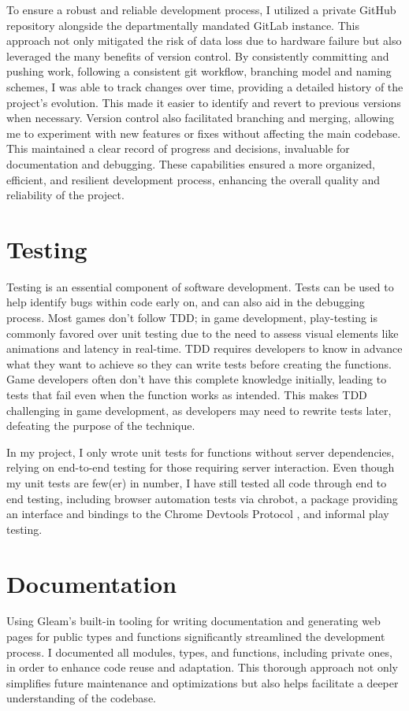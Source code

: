 \documentclass[]{final}
\begin{document}
To ensure a robust and reliable development process, I utilized a private GitHub repository
alongside the departmentally mandated GitLab instance. This approach not only mitigated
the risk of data loss due to hardware failure but also leveraged the many benefits of
version control. By consistently committing and pushing work, following a consistent
git workflow, branching model and naming schemes, I was able to track changes
over time, providing a detailed history of the project's evolution. This made
it easier to identify and revert to previous versions when necessary. Version
control also facilitated branching and merging, allowing me to experiment with
new features or fixes without affecting the main codebase. This maintained a
clear record of progress and decisions, invaluable for documentation and debugging.
These capabilities ensured a more organized, efficient, and resilient development
process, enhancing the overall quality and reliability of the project.

\section{Testing}
Testing is an essential component of software development. Tests can be used to
help identify bugs within code early on, and can also aid in the debugging process.
Most games don't follow TDD; in game development, play-testing is commonly favored
over unit testing due to the need to assess visual elements like animations and
latency in real-time.\cite{politowski_survey_2021} TDD requires developers to know
in advance what they want to
achieve so they can write tests before creating the functions. Game developers often don't
have this complete knowledge initially, leading to tests that fail even when the function
works as intended. This makes TDD challenging in game development, as developers may
need to rewrite tests later, defeating the purpose of the technique.

In my project, I only wrote unit tests for functions without server
dependencies, relying on end-to-end testing for those requiring server interaction.
Even though my unit tests are few(er) in number, I have still tested all code through
end to end testing, including browser automation tests via chrobot, a package providing
an interface and bindings to the Chrome Devtools Protocol \cite{noauthor_chrobot_nodate},
and informal play testing.

\section{Documentation}
Using Gleam's built-in tooling for writing documentation and generating web pages
for public types and functions significantly streamlined the development process.
I documented all modules, types, and functions, including private ones,
in order to enhance code reuse and adaptation. This thorough approach not
only simplifies future maintenance and optimizations but also helps facilitate a
deeper understanding of the codebase.
\end{document}
